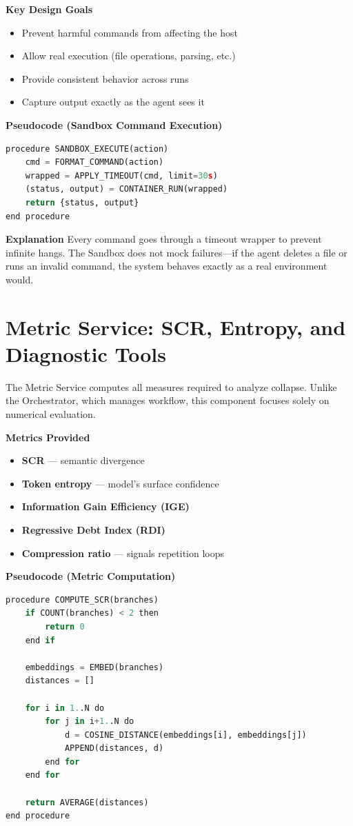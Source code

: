 \documentclass[12pt,a4paper]{report}
\begin{document}
\textbf{Key Design Goals}
\begin{itemize}
    \item Prevent harmful commands from affecting the host
    \item Allow real execution (file operations, parsing, etc.)
    \item Provide consistent behavior across runs
    \item Capture output exactly as the agent sees it
\end{itemize}
\cite{Li2025RedTeamCUA, Guo2025AgentGuard}

\textbf{Pseudocode (Sandbox Command Execution)}
\begin{lstlisting}[language=Python, caption=Sandbox Execution]
procedure SANDBOX_EXECUTE(action)
    cmd = FORMAT_COMMAND(action)
    wrapped = APPLY_TIMEOUT(cmd, limit=30s)
    (status, output) = CONTAINER_RUN(wrapped)
    return {status, output}
end procedure
\end{lstlisting}

\textbf{Explanation}
Every command goes through a timeout wrapper to prevent infinite hangs. The Sandbox does not mock failures—if the agent deletes a file or runs an invalid command, the system behaves exactly as a real environment would.

\section{Metric Service: SCR, Entropy, and Diagnostic Tools}
The Metric Service computes all measures required to analyze collapse. Unlike the Orchestrator, which manages workflow, this component focuses solely on numerical evaluation.

\textbf{Metrics Provided}
\begin{itemize}
    \item \textbf{SCR} — semantic divergence \cite{Zhou2024Consistency}
    \item \textbf{Token entropy} — model’s surface confidence
    \item \textbf{Information Gain Efficiency (IGE)}
    \item \textbf{Regressive Debt Index (RDI)}
    \item \textbf{Compression ratio} — signals repetition loops
\end{itemize}

\textbf{Pseudocode (Metric Computation)}
\begin{lstlisting}[language=Python, caption=SCR Calculation]
procedure COMPUTE_SCR(branches)
    if COUNT(branches) < 2 then
        return 0
    end if

    embeddings = EMBED(branches)
    distances = []

    for i in 1..N do
        for j in i+1..N do
            d = COSINE_DISTANCE(embeddings[i], embeddings[j])
            APPEND(distances, d)
        end for
    end for

    return AVERAGE(distances)
end procedure
\end{lstlisting}
\end{document}
